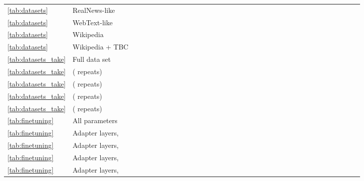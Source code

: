 \documentclass[twoside,11pt]{article}
\newcommand{\bsl}{\makebox[0pt][r]{\raisebox{0.05em}{}}}
\begin{document}
\begin{table}[!ht]
\begin{minipage}{0.85\pdfpagewidth}
\begin{tabular}{llccccccccccccccccccccccccccccccccc}
\ref{tab:datasets} & RealNews-like &  &  &  &  &  &  &  &  &  &  &  &  &  &  &  &  &  &  &  &  &  &  &  &  &  &  &  &  &  &  &  &  &  \\
\ref{tab:datasets} & WebText-like &  &  &  &  &  &  &  &  &  &  &  &  &  &  &  &  &  &  &  &  &  &  &  &  &  &  &  &  &  &  &  &  &  \\
\ref{tab:datasets} & Wikipedia &  &  &  &  &  &  &  &  &  &  &  &  &  &  &  &  &  &  &  &  &  &  &  &  &  &  &  &  &  &  &  &  &  \\
\ref{tab:datasets} & Wikipedia + TBC &  &  &  &  &  &  &  &  &  &  &  &  &  &  &  &  &  &  &  &  &  &  &  &  &  &  &  &  &  &  &  &  &  \\
\cmidrule(r){1-2} \cmidrule(lr){3-15} \cmidrule(lr){16-18} \cmidrule(lr){19-20} \cmidrule(lr){21-32} \cmidrule(l){33-35}
\ref{tab:datasets_take} & \bsl Full data set &  &  &  &  &  &  &  &  &  &  &  &  &  &  &  &  &  &  &  &  &  &  &  &  &  &  &  &  &  &  &  &  &  \\
\ref{tab:datasets_take} &  ( repeats) &  &  &  &  &  &  &  &  &  &  &  &  &  &  &  &  &  &  &  &  &  &  &  &  &  &  &  &  &  &  &  &  &  \\
\ref{tab:datasets_take} &  ( repeats) &  &  &  &  &  &  &  &  &  &  &  &  &  &  &  &  &  &  &  &  &  &  &  &  &  &  &  &  &  &  &  &  &  \\
\ref{tab:datasets_take} &  ( repeats) &  &  &  &  &  &  &  &  &  &  &  &  &  &  &  &  &  &  &  &  &  &  &  &  &  &  &  &  &  &  &  &  &  \\
\ref{tab:datasets_take} &  ( repeats) &  &  &  &  &  &  &  &  &  &  &  &  &  &  &  &  &  &  &  &  &  &  &  &  &  &  &  &  &  &  &  &  &  \\
\cmidrule(r){1-2} \cmidrule(lr){3-15} \cmidrule(lr){16-18} \cmidrule(lr){19-20} \cmidrule(lr){21-32} \cmidrule(l){33-35}
\ref{tab:finetuning} & \bsl All parameters &  &  &  &  &  &  &  &  &  &  &  &  &  &  &  &  &  &  &  &  &  &  &  &  &  &  &  &  &  &  &  &  &  \\
\ref{tab:finetuning} & Adapter layers,  &  &  &  &  &  &  &  &  &  &  &  &  &  &  &  &  &  &  &  &  &  &  &  &  &  &  &  &  &  &  &  &  &  \\
\ref{tab:finetuning} &  Adapter layers,  &  &  &  &  &  &  &  &  &  &  &  &  &  &  &  &  &  &  &  &  &  &  &  &  &  &  &  &  &  &  &  &  &  \\
\ref{tab:finetuning} & Adapter layers,  &  &  &  &  &  &  &  &  &  &  &  &  &  &  &  &  &  &  &  &  &  &  &  &  &  &  &  &  &  &  &  &  &  \\
\ref{tab:finetuning} & Adapter layers,  &  &  &  &  &  &  &  &  &  &  &  &  &  &  &  &  &  &  &  &  &  &  &  &  &  &  &  &  &  &  &  &  &  \\

\end{tabular}
\end{minipage}
\end{table}
\end{document}

